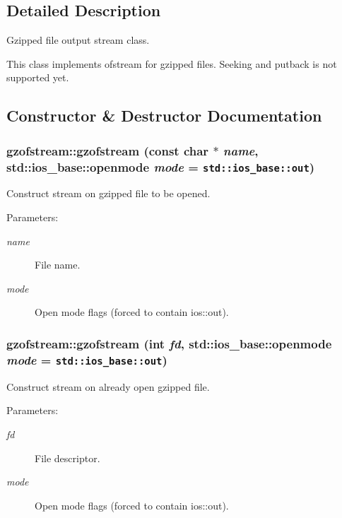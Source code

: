 \subsection{Detailed Description}
Gzipped file output stream class. 

This class implements ofstream for gzipped files. Seeking and putback is not supported yet. 



\subsection{Constructor \& Destructor Documentation}
\subsubsection{\setlength{\rightskip}{0pt plus 5cm}gzofstream::gzofstream (const char $\ast$ {\em name}, std::ios\_\-base::openmode {\em mode} = {\tt std::ios\_\-base::out})\hspace{0.3cm}{\tt  [explicit]}}\label{classgzofstream_e0cb9d7a9a986d90651772ee904d5903}


Construct stream on gzipped file to be opened. 

\begin{Desc}
\item[Parameters:]
\begin{description}
\item[{\em name}]File name. \item[{\em mode}]Open mode flags (forced to contain ios::out). \end{description}
\end{Desc}
\subsubsection{\setlength{\rightskip}{0pt plus 5cm}gzofstream::gzofstream (int {\em fd}, std::ios\_\-base::openmode {\em mode} = {\tt std::ios\_\-base::out})\hspace{0.3cm}{\tt  [explicit]}}\label{classgzofstream_846b2a7b49d04e847c988bbd86486c3f}


Construct stream on already open gzipped file. 

\begin{Desc}
\item[Parameters:]
\begin{description}
\item[{\em fd}]File descriptor. \item[{\em mode}]Open mode flags (forced to contain ios::out). \end{description}
\end{Desc}


